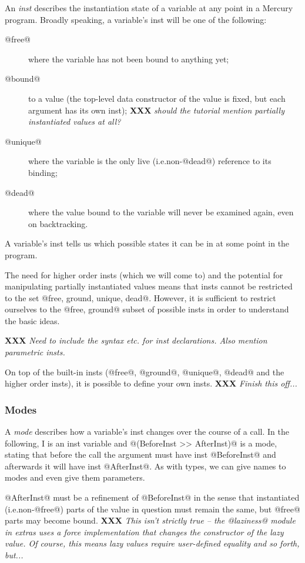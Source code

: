\documentclass[a4paper,11pt,notitlepage,onecolumn]{article}
\makeatletter
\newcommand{\ie}%
{i.e.\@ }
\newcommand{\XXX}[1]%
{{\small\textbf{XXX} \emph{#1}}}
\makeatother
\begin{document}
An \emph{inst} describes the instantiation state of a variable
at any point in a Mercury program.  Broadly speaking, a
variable's inst will be one of the following:
\begin{description}
\item[@free@] where the variable has not been bound to anything yet;
\item[@bound@] to a value (the top-level
  data constructor of the value is fixed, but each argument has its own
  inst);
  \XXX{should the tutorial mention partially instantiated
  values at all?}
\item[@unique@] where the variable is the only live (\ie non-@dead@)
  reference to its binding;
\item[@dead@] where the value bound to the variable will never be
  examined again, even on backtracking.
\end{description}

A variable's inst tells us which possible states it can be
in at some point in the program.

The need for higher order insts (which we will come to)
and the potential for manipulating partially instantiated
values means that insts cannot be restricted to the set
@{free, ground, unique, dead}@.  However, it is sufficient
to restrict ourselves to the @{free, ground}@ subset of
possible insts in order to understand the basic ideas.

\XXX{Need to include the syntax etc. for inst
declarations.  Also mention parametric insts.}

On top of the built-in insts (@free@, @ground@, @unique@, @dead@
and the higher order insts), it is possible to define your
own insts.  \XXX{Finish this off...}

\subsubsection{Modes}

A \emph{mode} describes how a variable's inst changes over the
course of a call.  In the following, I is an inst
variable and @(BeforeInst >> AfterInst)@ is a mode, stating
that before the call the argument must have inst
@BeforeInst@ and afterwards it will have inst @AfterInst@.  As
with types, we can give names to modes and even give them
parameters.

@AfterInst@ must be a refinement of @BeforeInst@ in the sense
that instantiated (\ie non-@free@) parts of the value in
question must remain the same, but @free@ parts may become
bound.  \XXX{This isn't strictly true -- the @laziness@
module in extras uses a force implementation that changes
the constructor of the lazy value.  Of course, this means
lazy values require user-defined equality and so forth,
but...}
\end{document}
